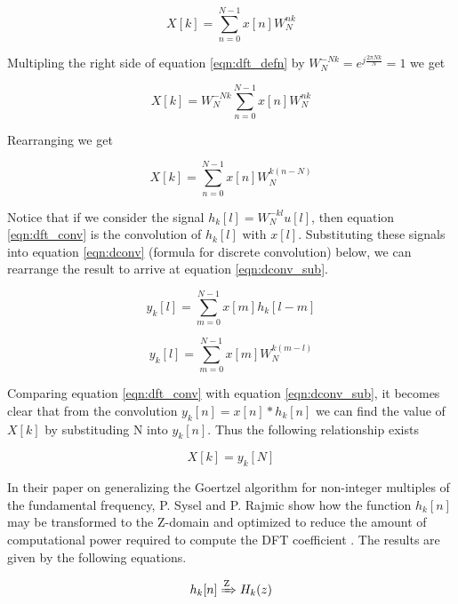 \begin{equation}
\label{eqn:dft_defn}
X[k] = \sum_{n=0}^{N-1}x[n]W_{N}^{nk}
\end{equation}

Multipling the right side of equation \ref{eqn:dft_defn} by \(W_{N}^{-Nk} = e^{j\frac{2\pi N k}{N}} = 1\) we get

\begin{equation}
X[k] = W_{N}^{-Nk}\sum_{n=0}^{N-1}x[n]W_{N}^{nk}
\end{equation}

Rearranging we get

\begin{equation}
\label{eqn:dft_conv}
X[k] = \sum_{n=0}^{N-1}x[n]W_{N}^{k(n-N)}
\end{equation}

Notice that if we consider the signal \(h_k[l] = W_N^{-kl}u[l]\), then equation \ref{eqn:dft_conv} is the convolution of $h_k[l]$ with $x[l]$. Substituting these signals into equation \ref{eqn:dconv} (formula for discrete convolution) below, we can rearrange the result to arrive at equation \ref{eqn:dconv_sub}.

\begin{equation}
\label{eqn:dconv}
y_k[l] = \sum_{m=0}^{N-1}x[m]h_k[l - m]
\end{equation}

\begin{equation}
\label{eqn:dconv_sub}
y_k[l] = \sum_{m=0}^{N-1}x[m]W_N^{k(m-l)}
\end{equation}

Comparing equation \ref{eqn:dft_conv} with equation \ref{eqn:dconv_sub}, it becomes clear that from the convolution $y_k[n] = x[n] * h_k[n]$ we can find the value of $X[k]$ by substituding N into $y_k[n]$. Thus the following relationship exists

\begin{equation}
\label{eqn:goertzel_relationship}
X[k] = y_k[N]
\end{equation}


In their paper on generalizing the Goertzel algorithm for non-integer multiples of the fundamental frequency, P. Sysel and P. Rajmic show how the function $h_k[n]$ may be transformed to the Z-domain and optimized to reduce the amount of computational power required to compute the DFT coefficient \cite{Sysel2012}. The results are given by the following equations.

\[h_k[n] \xRightarrow{\text{Z}} H_k(z)\]

